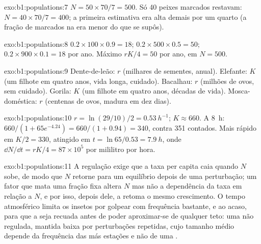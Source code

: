 \begin{solution}{exo:b1:populations:7}
$N = 50\times 70/7 = 500$. Só 40 peixes marcados restavam: $N = 40\times
70/7 = 400$; a primeira estimativa era alta demais por um quarto (a
fração de marcados na  era menor do que se supôs).
\end{solution}

\begin{solution}{exo:b1:populations:8}
$0.2\times 100\times 0.9 = 18$; $0.2\times 500\times 0.5 = 50$;
$0.2\times 900\times 0.1 = 18$ por ano. Máximo $rK/4 = 50$ por ano, em
$N = 500$.
\end{solution}

\begin{solution}{exo:b1:populations:9}
Dente-de-leão: $r$ (milhares de sementes, anual). Elefante: $K$ (um
filhote em quatro anos, vida longa, cuidado). Bacalhau: $r$ (milhões
de ovos, sem cuidado). Gorila: $K$ (um filhote em quatro anos, décadas
de vida). Mosca-doméstica: $r$ (centenas de ovos, madura em dez dias).
\end{solution}

\begin{solution}{exo:b1:populations:10}
$r = \ln(29/10)/2 = \qty{0.53}{h^{-1}}$; $K \approx 660$. A \qty{8}{h}:
$660/(1 + 65e^{-4.24}) = 660/(1 + 0.94) = 340$, contra 351 contados.
Mais rápido em $K/2 = 330$, atingido em $t = \ln 65/0.53 = \qty{7.9}{h}$,
onde $\dd N/\dd t = rK/4 = 87\times 10^5$  por mililitro por
hora.
\end{solution}

\begin{solution}{exo:b1:populations:11}
A regulação exige que a taxa per capita caia quando $N$ sobe, de modo
que $N$ retorne para um equilíbrio depois de uma perturbação; um fator
que mata uma fração fixa altera $N$ mas não a dependência da taxa em
relação a $N$, e por isso, depois dele, a  retoma o mesmo
crescimento. O tempo atmosférico limita os insetos por golpear com
frequência bastante, e ao acaso, para que a  seja recuada
antes de poder aproximar-se de qualquer teto: uma  não
regulada, mantida baixa por perturbações repetidas, cujo tamanho médio
depende da frequência das más estações e não de uma .
\end{solution}


